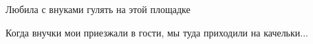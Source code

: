  
 
 
 
 

\qqSecCmt


Любила с внуками гулять на этой площадке


Когда внучки мои приезжали в гости, мы туда приходили на качельки...
